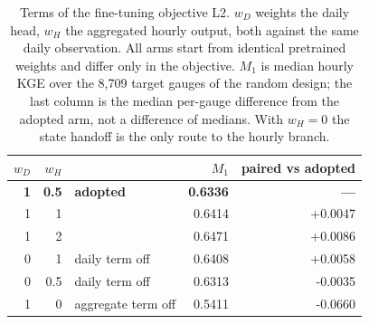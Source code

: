 \begin{table}[H]
\caption{Terms of the fine-tuning objective L2. $w_D$ weights the daily head, $w_H$ the aggregated hourly output, both against the same daily observation. All arms start from identical pretrained weights and differ only in the objective. $M_1$ is median hourly KGE over the 8,709 target gauges of the random design; the last column is the median per-gauge difference from the adopted arm, not a difference of medians. With $w_H = 0$ the state handoff is the only route to the hourly branch.}
\label{tab:objective}
\centering
\begin{tabular}{rrl rr}
\toprule
$w_D$ & $w_H$ & & $M_1$ & paired vs adopted \\
\midrule
  \bfseries 1 & \bfseries 0.5 & \bfseries adopted & \bfseries 0.6336 & \bfseries --- \\
  1 & 1 &  & 0.6414 & +0.0047 \\
  1 & 2 &  & 0.6471 & +0.0086 \\
  0 & 1 & daily term off & 0.6408 & +0.0058 \\
  0 & 0.5 & daily term off & 0.6313 & -0.0035 \\
  1 & 0 & aggregate term off & 0.5411 & -0.0660 \\
\bottomrule
\end{tabular}
\end{table}
